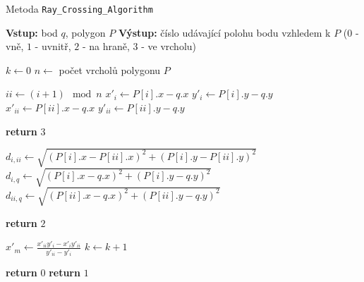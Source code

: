 \begin{algorithm}
    \caption{Metoda \texttt{Ray\_Crossing\_Algorithm}}
    \begin{algorithmic}[1]
        \STATE \textbf{Vstup:} bod $q$, polygon $P$
        \STATE \textbf{Výstup:} číslo udávající polohu bodu vzhledem k $P$ ($0$ - vně, $1$ - uvnitř, $2$ - na hraně, $3$ - ve vrcholu)
        
        \STATE $k \gets 0$ 
        \STATE $n \gets$ počet vrcholů polygonu $P$
        
            \STATE $ii \gets (i + 1) \mod n$
            \STATE $x'_i \gets P[i].x - q.x$
            \STATE $y'_i \gets P[i].y - q.y$
            \STATE $x'_{ii} \gets P[ii].x - q.x$
            \STATE $y'_{ii} \gets P[ii].y - q.y$
            
                \STATE \textbf{return} $3$ 
            \ENDIF
            
            \STATE $d_{i,ii} \gets \sqrt{(P[i].x - P[ii].x)^2 + (P[i].y - P[ii].y)^2}$
            \STATE $d_{i,q} \gets \sqrt{(P[i].x - q.x)^2 + (P[i].y - q.y)^2}$
            \STATE $d_{ii,q} \gets \sqrt{(P[ii].x - q.x)^2 + (P[ii].y - q.y)^2}$
            
                \STATE \textbf{return} $2$ 
            \ENDIF
            
                \STATE $x'_m \gets \frac{x'_{ii} y'_i - x'_i y'_{ii}}{y'_{ii} - y'_i}$
                    \STATE $k \gets k + 1$
                \ENDIF
            \ENDIF
        \ENDFOR
        
            \STATE \textbf{return} $0$ 
        \ELSE
            \STATE \textbf{return} $1$ 
        \ENDIF
    \end{algorithmic}
\end{algorithm}
